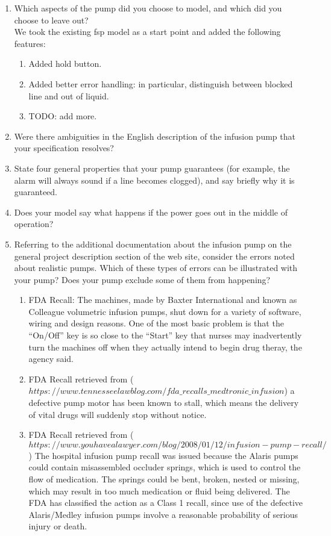 \documentclass{article}
\begin{document}
\begin{enumerate}
\item Which aspects of the pump did you choose to model, and which did you choose to leave out? \\
  We took the existing fsp model as a start point and added the following features: \\
  \begin{enumerate}
  \item Added hold button.
  \item Added better error handling: in particular, distinguish between blocked line and out of liquid.
    \item TODO: add more.
  \end{enumerate}
    \item Were there ambiguities in the English description of the infusion pump that your specification resolves?
    \item State four general properties that your pump guarantees (for example, the alarm will always sound if a line becomes clogged), and say briefly why it is guaranteed.
    \item Does your model say what happens if the power goes out in the middle of operation?
    \item Referring to the additional documentation about the infusion pump on the general project description section of the web site, consider the errors noted about realistic pumps. Which of these types of errors can be illustrated with your pump? Does your pump exclude some of them from happening? \\
      \begin{enumerate}
      \item FDA Recall: The machines, made by Baxter International and known as Colleague volumetric infusion pumps, shut down for a variety of software, wiring and design reasons. One of the most basic problem is that the ``On/Off'' key is so close to the ``Start'' key that nurses may inadvertently turn the machines off when they actually intend to begin drug theray, the agency said.
      \item FDA Recall retrieved from ($https://www.tennesseelawblog.com/fda\_recalls\_medtronic\_infusion$) a defective pump motor has been known to stall, which means the delivery of vital drugs will suddenly stop without notice.
      \item FDA Recall retrieved from ($https://www.youhavealawyer.com/blog/2008/01/12/infusion-pump-recall/$) The hospital infusion pump recall was issued because the Alaris pumps could contain misassembled occluder springs, which is used to control the flow of medication. The springs could be bent, broken, nested or missing, which may result in too much medication or fluid being delivered. The FDA has classified the action as a Class 1 recall, since use of the defective Alaris/Medley infusion pumps involve a reasonable probability of serious injury or death.\\

\end{enumerate}
\end{enumerate}
\end{document}
